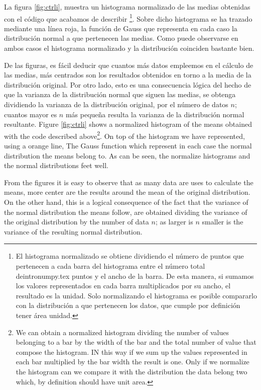 \begin{paracol}{2}
La figura \ref{fig:ctrli}, muestra un histograma normalizado de las medias obtenidas con el código que acabamos de describir \footnote{El histograma normalizado se obtiene dividiendo el número de puntos que pertenecen a cada barra del histograma entre el número total deintronumpy.tex puntos y el ancho de la barra. De esta manera, si sumamos los valores representados en cada barra multiplicados por su ancho, el resultado es la unidad. Solo normalizando el histograma es posible compararlo con la distribución a que pertenecen los datos, que cumple por definición tener área unidad.}. Sobre dicho histograma se ha trazado mediante una línea roja, la función de Gauss que representa en cada caso la distribución normal a que pertenecen las medias. Como puede observarse en ambos casos el histograma normalizado y la distribución coinciden bastante bien.

De las figuras, es fácil deducir que cuantos más datos empleemos en el cálculo de las medias, más centrados son los resultados obtenidos en torno a la media de la distribución original. Por otro lado, esto es una consecuencia lógica del hecho de que la varianza de la distribución normal que siguen las medias, se obtenga dividiendo la varianza de la distribución original, por el número de datos $n$; cuantos mayor es $n$ más pequeña resulta la varianza de la distribución normal resultante.
\switchcolumn
Figure \ref{fig:ctrli} shows a normalized histogram of the means obtained with the code described above\footnote{We can obtain a normalized histogram dividing the number of values belonging to a bar by the width of the bar and the total number of value that compose the histogram. IN this way if we sum up the values represented in each bar multiplied by the bar width the result is one. Only if we normalize the histogram can we compare it with the distribution the data belong two which, by definition should have unit area.}. On top of the histogram we have represented, using a orange line, The Gauss function which represent in each case the normal distribution the means belong to. As can be seen, the normalize histograms and the normal distributions feet well.

From the figures it is easy to observe that as many data are uses to calculate the means, more center are the results around the mean of the original distribution. On the other hand, this is a logical consequence of the fact that the variance of the normal distribution the means follow, are obtained dividing the variance of the original distribution by the number of data $n$; as larger is $n$ smaller is the variance of the resulting normal distribution.  
\end{paracol}
 
